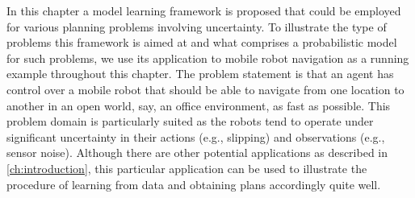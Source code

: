 
In this chapter a model learning framework is proposed that could be employed for various planning problems involving uncertainty.
To illustrate the type of problems this framework is aimed at and what comprises a probabilistic model for such problems, we use its application to mobile robot navigation as a running example throughout this chapter.
The problem statement is that an agent has control over a mobile robot that should be able to navigate from one location to another in an open world, say, an office environment, as fast as possible.
This problem domain is particularly suited as the robots tend to operate under significant uncertainty in their actions (e.g., slipping) and observations (e.g., sensor noise).
Although there are other potential applications as described in \autoref{ch:introduction}, this particular application can be used to illustrate the procedure of learning  from data and obtaining plans accordingly quite well.

